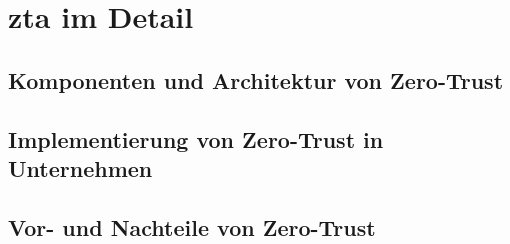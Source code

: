 \newpage
\section[Zero-Trust Architektur im Detail]{\ac{zta} im Detail}\label{sec:zta-im-detail}

\subsection{Komponenten und Architektur von Zero-Trust}\label{subsec:komponenten-und-architektur-von-zero-trust}

\subsection{Implementierung von Zero-Trust in Unternehmen}\label{subsec:implementierung-von-zero-trust-in-unternehmen}

\subsection{Vor- und Nachteile von Zero-Trust}\label{subsec:vor-und-nachteile-von-zero-trust}